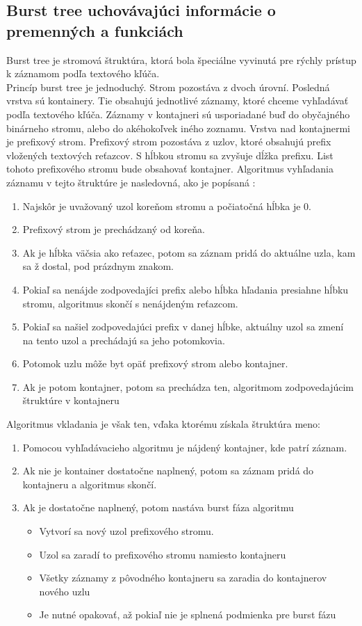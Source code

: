 \subsection {Burst tree uchovávajúci informácie o premenných a funkciách} 
Burst tree je stromová štruktúra, ktorá bola špeciálne vyvinutá pre rýchly prístup k záznamom podľa textového kľúča.\\
Princíp burst tree je jednoduchý. Strom pozostáva z dvoch úrovní. Posledná vrstva sú kontainery. Tie obsahujú jednotlivé záznamy, ktoré chceme vyhľadávať podľa textového kľúča. Záznamy v kontajneri sú usporiadané buď do obyčajného binárneho stromu, alebo do akéhokoľvek iného zoznamu. Vrstva nad kontajnermi je prefixový strom. Prefixový strom pozostáva z uzlov, ktoré obsahujú prefix vložených textových reťazcov. S hĺbkou stromu sa zvyšuje dĺžka prefixu. List tohoto prefixového stromu bude obsahovať kontajner. Algoritmus vyhľadania záznamu v tejto štruktúre je nasledovná, ako je popísaná \cite{trees}:\\ 
\begin{enumerate}
\item Najskôr je uvažovaný uzol koreňom stromu a počiatočná hĺbka je 0.
\item Prefixový strom je prechádzaný od koreňa.
\item Ak je hĺbka väčsia ako reťazec, potom sa záznam pridá do aktuálne uzla, kam sa ž dostal, pod prázdnym znakom.
\item Pokiaľ sa nenájde zodpovedajíci prefix alebo hĺbka hľadania presiahne hĺbku stromu, algoritmus skončí s nenájdeným reťazcom.
\item Pokiaľ sa našiel zodpovedajúci prefix v danej hĺbke, aktuálny uzol sa zmení na tento uzol a prechádajú sa jeho potomkovia.
\item Potomok uzlu môže byt opäť prefixový strom alebo kontajner.
\item Ak je potom kontajner, potom sa prechádza ten, algoritmom zodpovedajúcim štruktúre v kontajneru
\end{enumerate}
Algoritmus vkladania je však ten, vďaka ktorému získala štruktúra meno:\\
\begin{enumerate}
\item Pomocou vyhľadávacieho algoritmu je nájdený kontajner, kde patrí záznam.
\item Ak nie je kontainer dostatočne naplnený, potom sa záznam pridá do kontajneru a algoritmus skončí.
\item Ak je dostatočne naplnený, potom nastáva burst fáza algoritmu
\begin{itemize}
\item Vytvorí sa nový uzol prefixového stromu.
\item Uzol sa zaradí to prefixového stromu namiesto kontajneru
\item Všetky záznamy z pôvodného kontajneru sa zaradia do kontajnerov nového uzlu
\item Je nutné opakovať, až pokiaľ nie je splnená podmienka pre burst fázu
\end{itemize}
\end{enumerate}
